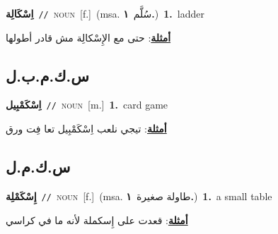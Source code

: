 \documentclass[10pt,a4paper,twoside]{article} %
\begin{document}
\begin{multicols}{2}
{\setlength\topsep{0pt}\textbf{\foreignlanguage{arabic}{اِسْكَالِة}}\ {\color{gray}\texttt{//}\color{black}}\ \textsc{noun}\ [f.]\ \color{gray}(msa. \foreignlanguage{arabic}{سُلَّم}~\foreignlanguage{arabic}{\textbf{١.}})\color{black}\ \textbf{1.}~ladder\  \begin{flushright}\color{gray}\foreignlanguage{arabic}{\textbf{\underline{\foreignlanguage{arabic}{أمثلة}}}: حتى مع الإِسْكالِة مش قادر أطولها}\end{flushright}\color{black}} \vspace{2mm}

\vspace{-3mm}
\subsection*{\color{blue}\foreignlanguage{arabic}{س.ك.م.ب.ل}\color{blue}{ (ntws)}} 

{\setlength\topsep{0pt}\textbf{\foreignlanguage{arabic}{اِسْكَمْبِيل}}\ {\color{gray}\texttt{//}\color{black}}\ \textsc{noun}\ [m.]\ \textbf{1.}~card game\  \begin{flushright}\color{gray}\foreignlanguage{arabic}{\textbf{\underline{\foreignlanguage{arabic}{أمثلة}}}: تيجي نلعب اِسْكَمْبِيل تعا فِت ورق}\end{flushright}\color{black}} \vspace{2mm}

\vspace{-3mm}
\subsection*{\color{blue}\foreignlanguage{arabic}{س.ك.م.ل}\color{blue}{ (ntws)}} 

{\setlength\topsep{0pt}\textbf{\foreignlanguage{arabic}{إِسْكَمْلِة}}\ {\color{gray}\texttt{//}\color{black}}\ \textsc{noun}\ [f.]\ \color{gray}(msa. \foreignlanguage{arabic}{طاولة صغيرة}~\foreignlanguage{arabic}{\textbf{١.}})\color{black}\ \textbf{1.}~a small table\  \begin{flushright}\color{gray}\foreignlanguage{arabic}{\textbf{\underline{\foreignlanguage{arabic}{أمثلة}}}: قعدت على إِسكملة لأنه ما في كراسي}\end{flushright}\color{black}} \vspace{2mm}


\end{multicols}
\end{document}
